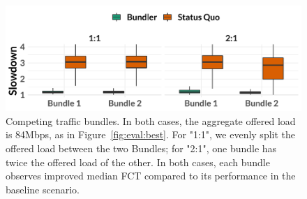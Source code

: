 \begin{figure}
    \centering
\begin{knitrout}
\color{fgcolor}
\includegraphics[width=\maxwidth]{figure/robust_twobundler-1} 

\end{knitrout}
    \caption{Competing traffic bundles. In both cases, the aggregate offered load is 84Mbps, as in Figure~\ref{fig:eval:best}. For "1:1", we evenly split the offered load between the two Bundles; for "2:1", one bundle has twice the offered load of the other. In both cases, each bundle observes improved median FCT compared to its performance in the baseline scenario.}
    \label{fig:robust:twobundler}
\end{figure}
